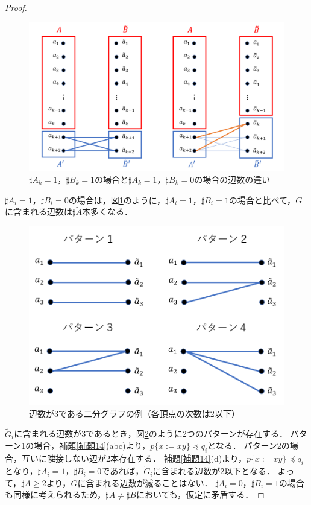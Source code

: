 \begin{proof}
\begin{figure}[H]
\includegraphics[width=\linewidth]{画像/abが異なる場合.png}
\caption{\scriptsize $\sharp A_{k} =1，\sharp B_{k}=1$の場合と$\sharp A_{k}=1，\sharp B_{k}=0$の場合の辺数の違い}
\label{abが異なる場合}
\end{figure}

$\sharp A_{i}=1，\sharp B_{i}=0$の場合は，図\ref{abが異なる場合}のように，$\sharp A_{i} =1，\sharp B_{i}=1$の場合と比べて，$G$に含まれる辺数は$\sharp\tilde{A}$本多くなる．

\begin{figure}[H]
\includegraphics[width=\linewidth]{画像/辺3におけるパターン.png}
\caption{\scriptsize 辺数が3である二分グラフの例（各頂点の次数は2以下）}
\label{辺3におけるパターン}
\end{figure}

$\tilde{G}_{i}$に含まれる辺数が3であるとき，図\ref{辺3におけるパターン}のように2つのパターンが存在する．
パターン1の場合，補題\ref{補題14}(abc)より，$p \{ x:=xy \} \preceq q_{i}$となる．
パターン2の場合，互いに隣接しない辺が2本存在する．
補題\ref{補題14}(d)より，$p \{ x:=xy \} \preceq q_{i}$となり，$\sharp A_{i}=1，\sharp B_{i}=0$であれば，$\tilde{G}_{i}$に含まれる辺数が2以下となる．
よって，$\sharp\tilde{A} \ge 2$より，$G$に含まれる辺数が減ることはない．
$\sharp A_{i}=0，\sharp B_{i}=1$の場合も同様に考えられるため，$\sharp A \not = \sharp B$においても，仮定に矛盾する．
\end{proof}


